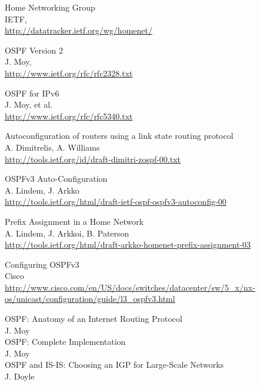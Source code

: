 \documentclass[12pt]{report}
\begin{document}
\begin{thebibliography}{9}


	Home Networking Group \\
	IETF,\\
	\url{http://datatracker.ietf.org/wg/homenet/}

	OSPF Version 2 \\
	J. Moy,\\
	\url{http://www.ietf.org/rfc/rfc2328.txt}

	OSPF for IPv6 \\
	J. Moy, et al.\\
	\url{http://www.ietf.org/rfc/rfc5340.txt}

	Autoconfiguration of routers using a link state routing protocol \\
	A. Dimitrelis, A. Williams\\
	\url{http://tools.ietf.org/id/draft-dimitri-zospf-00.txt}

	OSPFv3 Auto-Configuration \\
	A. Lindem, J. Arkko\\
	\url{http://tools.ietf.org/html/draft-ietf-ospf-ospfv3-autoconfig-00}

	Prefix Assignment in a Home Network \\
	A. Lindem, J. Arkkoi, B. Paterson\\
	\url{http://tools.ietf.org/html/draft-arkko-homenet-prefix-assignment-03}

	Configuring OSPFv3 \\
	Cisco\\
	\url{http://www.cisco.com/en/US/docs/switches/datacenter/sw/5\_x/nx-os/unicast/configuration/guide/l3\_ospfv3.html}

	OSPF: Anatomy of an Internet Routing Protocol\\
	J. Moy\\

	OSPF: Complete Implementation\\
	J. Moy\\

	OSPF and IS-IS: Choosing an IGP for Large-Scale Networks\\
	J. Doyle\\


\end{thebibliography}
\end{document}
